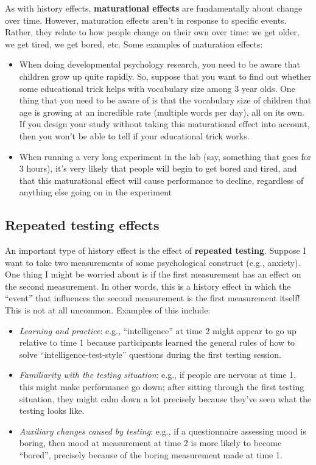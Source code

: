 \documentclass[
]{book}
\begin{document}
As with history effects, \textbf{maturational effects} are fundamentally about change over time. However, maturation effects aren't in response to specific events. Rather, they relate to how people change on their own over time: we get older, we get tired, we get bored, etc. Some examples of maturation effects:

\begin{itemize}
\item
  When doing developmental psychology research, you need to be aware that children grow up quite rapidly. So, suppose that you want to find out whether some educational trick helps with vocabulary size among 3 year olds. One thing that you need to be aware of is that the vocabulary size of children that age is growing at an incredible rate (multiple words per day), all on its own. If you design your study without taking this maturational effect into account, then you won't be able to tell if your educational trick works.
\item
  When running a very long experiment in the lab (say, something that goes for 3 hours), it's very likely that people will begin to get bored and tired, and that this maturational effect will cause performance to decline, regardless of anything else going on in the experiment
\end{itemize}

\subsection{Repeated testing effects}\label{repeated-testing-effects}

An important type of history effect is the effect of \textbf{repeated testing}. Suppose I want to take two measurements of some psychological construct (e.g., anxiety). One thing I might be worried about is if the first measurement has an effect on the second measurement. In other words, this is a history effect in which the ``event'' that influences the second measurement is the first measurement itself! This is not at all uncommon. Examples of this include:

\begin{itemize}
\item
  {\emph{Learning and practice}}: e.g., ``intelligence'' at time 2 might appear to go up relative to time 1 because participants learned the general rules of how to solve ``intelligence-test-style'' questions during the first testing session.
\item
  {\emph{Familiarity with the testing situation}}: e.g., if people are nervous at time 1, this might make performance go down; after sitting through the first testing situation, they might calm down a lot precisely because they've seen what the testing looks like.
\item
  {\emph{Auxiliary changes caused by testing}}: e.g., if a questionnaire assessing mood is boring, then mood at measurement at time 2 is more likely to become ``bored'', precisely because of the boring measurement made at time 1.
\end{itemize}
\end{document}
